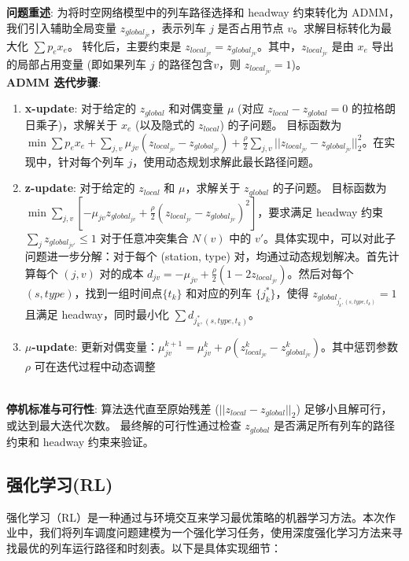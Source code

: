 \documentclass{article}
\begin{document}
    \textbf{问题重述}:
    为将时空网络模型中的列车路径选择和 headway 约束转化为 ADMM，我们引入辅助全局变量 $z_{global_{jv}}$，表示列车 $j$ 是否占用节点 $v$。求解目标转化为最大化 $\sum p_e x_e$。
    转化后，主要约束是 $z_{local_{jv}} = z_{global_{jv}}$。其中，$z_{local_{jv}}$ 是由 $x_e$ 导出的局部占用变量 (即如果列车 $j$ 的路径包含$v$，则 $z_{local_{jv}}=1$)。 \\
    \textbf{ADMM 迭代步骤}:
    \begin{enumerate}
        \item \textbf{x-update}:
        对于给定的 $z_{global}$ 和对偶变量 $\mu$ (对应
        $z_{local} - z_{global} = 0$ 的拉格朗日乘子)，求解关于
        $x_e$ (以及隐式的 $z_{local}$) 的子问题。
        目标函数为 $\min \sum p_e x_e + \sum_{j,v} \mu_{jv}
        (z_{local_{jv}} - z_{global_{jv}}) +
        \frac{\rho}{2} \sum_{j,v} ||z_{local_{jv}} -
        z_{global_{jv}}||_2^2$。在实现中，针对每个列车
        $j$，使用动态规划求解此最长路径问题。
        \item \textbf{z-update}:
        对于给定的 $z_{local}$ 和 $\mu$，求解关于 $z_{global}$ 的子问题。
        目标函数为 $\min \sum_{j,v} [-\mu_{jv}
        z_{global_{jv}} + \frac{\rho}{2}
        (z_{local_{jv}} - z_{global_{jv}})^2]$，要求满足
        headway 约束 $\sum_{j} z_{global_{jv'}} \le 1$
        对于任意冲突集合 $N(v)$ 中的 $v'$。具体实现中，可以对此子问题进一步分解：对于每个 (station, type)
        对，均通过动态规划解决。首先计算每个 $(j,v)$ 对的成本 $d_{jv} =-\mu_{jv} + \frac{\rho}{2} (1 - 2
        z_{local_{jv}})$。然后对每个 $(s, type)$，找到一组时间点$\{t_k\}$ 和对应的列车 $\{j_k^*\}$，使得
        $z_{global_{j_k^*, (s,type,t_k)}}=1$ 且满足 headway，同时最小化 $\sum d_{j_k^*, (s,type,t_k)}$。
        \item \textbf{$\mu$-update}:
        更新对偶变量：$\mu_{jv}^{k+1} = \mu_{jv}^k + \rho
        (z_{local_{jv}}^k - z_{global_{jv}}^k)$。其中惩罚参数 $\rho$ 可在迭代过程中动态调整
    \end{enumerate} \\
    \textbf{停机标准与可行性}:
    算法迭代直至原始残差 ($||z_{local} - z_{global}||_2$) 足够小且解可行，或达到最大迭代次数。
    最终解的可行性通过检查 $z_{global}$ 是否满足所有列车的路径约束和 headway 约束来验证。

    \subsection{强化学习(RL)}

    强化学习（RL）是一种通过与环境交互来学习最优策略的机器学习方法。本次作业中，我们将列车调度问题建模为一个强化学习任务，使用深度强化学习方法来寻找最优的列车运行路径和时刻表。以下是具体实现细节：
\end{document}
